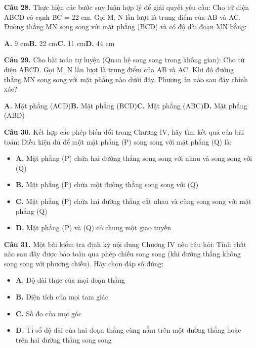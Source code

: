 \documentclass[11pt,a4paper]{article}
\begin{document}
\textbf{\color{primary} Câu 28.} Thực hiện các bước suy luận hợp lý để giải quyết yêu cầu: Cho tứ diện ABCD có cạnh BC = 22 cm. Gọi M, N lần lượt là trung điểm của AB và AC. Đường thẳng MN song song với mặt phẳng (BCD) và có độ dài đoạn MN bằng:\par
\hspace*{1.5em}\textbf{A.} 9 cm\quad\quad \textbf{B.} 22 cm\quad\quad \textbf{C.} 11 cm\quad\quad \textbf{D.} 44 cm\par\vspace{2pt}
\textbf{\color{primary} Câu 29.} Cho bài toán tự luyện (Quan hệ song song trong không gian): Cho tứ diện ABCD. Gọi M, N lần lượt là trung điểm của AB và AC. Khi đó đường thẳng MN song song với mặt phẳng nào dưới đây. Phương án nào sau đây chính xác?\par
\hspace*{1.5em}\textbf{A.} Mặt phẳng (ACD)\quad\quad \textbf{B.} Mặt phẳng (BCD)\quad\quad \textbf{C.} Mặt phẳng (ABC)\quad\quad \textbf{D.} Mặt phẳng (ABD)\par\vspace{2pt}
\textbf{\color{primary} Câu 30.} Kết hợp các phép biến đổi trong Chương IV, hãy tìm kết quả của bài toán: Điều kiện đủ để một mặt phẳng (P) song song với mặt phẳng (Q) là:\par
\begin{itemize}\setlength{\itemsep}{1pt}\setlength{\parskip}{0pt}
  \item[] \textbf{A.} Mặt phẳng (P) chứa hai đường thẳng song song với nhau và song song với (Q)
  \item[] \textbf{B.} Mặt phẳng (P) chứa một đường thẳng song song với (Q)
  \item[] \textbf{C.} Mặt phẳng (P) chứa hai đường thẳng cắt nhau và cùng song song với mặt phẳng (Q)
  \item[] \textbf{D.} Mặt phẳng (P) và (Q) có chung một giao tuyến
\end{itemize}\vspace{2pt}
\textbf{\color{primary} Câu 31.} Một bài kiểm tra định kỳ nội dung Chương IV nêu câu hỏi: Tính chất nào sau đây được bảo toàn qua phép chiếu song song (khi đường thẳng không song song với phương chiếu). Hãy chọn đáp số đúng:\par
\begin{itemize}\setlength{\itemsep}{1pt}\setlength{\parskip}{0pt}
  \item[] \textbf{A.} Độ dài thực của mọi đoạn thẳng
  \item[] \textbf{B.} Diện tích của mọi tam giác
  \item[] \textbf{C.} Số đo của mọi góc
  \item[] \textbf{D.} Tỉ số độ dài của hai đoạn thẳng cùng nằm trên một đường thẳng hoặc trên hai đường thẳng song song
\end{itemize}\vspace{2pt}
\end{document}

